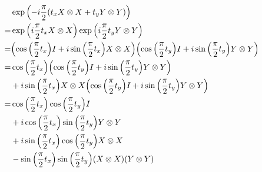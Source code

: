 \documentclass{article}
\begin{document}
\begin{align*}
  &\exp\pqty{-i\frac{\pi}{2}\pqty{t_x X\otimes X + t_y Y\otimes Y}} \\
  =& \exp\pqty{i\frac{\pi}{2}t_x X\otimes X} \exp\pqty{i\frac{\pi}{2}t_y Y\otimes Y} \\
  =& \pqty{\cos\pqty{\frac{\pi}{2}t_x} I + i\sin\pqty{\frac{\pi}{2}t_x} X\otimes X}
  \pqty{\cos\pqty{\frac{\pi}{2}t_y} I + i\sin\pqty{\frac{\pi}{2}t_y} Y\otimes Y} \\
  =& \cos\pqty{\frac{\pi}{2}t_x}\pqty{\cos\pqty{\frac{\pi}{2}t_y} I + i\sin\pqty{\frac{\pi}{2}t_y} Y\otimes Y} 
  \\&+
  i\sin\pqty{\frac{\pi}{2}t_x} X\otimes X\pqty{\cos\pqty{\frac{\pi}{2}t_y} I + i\sin\pqty{\frac{\pi}{2}t_y} Y\otimes Y}
  \\
  =& \cos\pqty{\frac{\pi}{2}t_x}\cos\pqty{\frac{\pi}{2}t_y} I
  \\&+ i\cos\pqty{\frac{\pi}{2}t_x}\sin\pqty{\frac{\pi}{2}t_y} Y\otimes Y 
  \\&+
  i\sin\pqty{\frac{\pi}{2}t_x} \cos\pqty{\frac{\pi}{2}t_y} X\otimes X
  \\&- \sin\pqty{\frac{\pi}{2}t_x} \sin\pqty{\frac{\pi}{2}t_y} \pqty{X\otimes X}\pqty{Y\otimes Y}
  \\
\end{align*}
\end{document}
